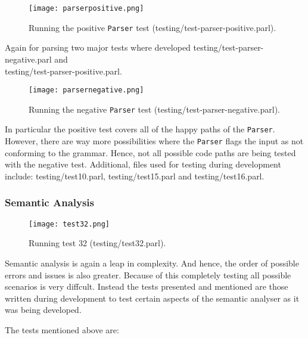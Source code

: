 \begin{figure}[H]
\centering
\texttt{[image: parserpositive.png]}
\caption{Running the positive \texttt{Parser} test
(testing/test-parser-positive.parl).}
\end{figure}

Again for parsing two major tests where developed
testing/test-parser-negative.parl and \\
testing/test-parser-positive.parl.

\begin{figure}[H]
\centering
\texttt{[image: parsernegative.png]}
\caption{Running the negative \texttt{Parser} test
(testing/test-parser-negative.parl).}
\end{figure}

In particular the positive test covers all of the happy paths of
the \texttt{Parser}. However, there are way more possibilities
where the \texttt{Parser} flags the input as not conforming to
the grammar. Hence, not all possible code paths are being tested
with the negative test. Additional, files used for testing
during development include: testing/test10.parl,
testing/test15.parl and testing/test16.parl.

\subsubsection{Semantic Analysis}

\begin{figure}[H]
\centering
\texttt{[image: test32.png]}
\caption{Running test 32 (testing/test32.parl).}
\end{figure}

Semantic analysis is again a leap in complexity. And hence, the
order of possible errors and issues is also greater. Because of
this completely testing all possible scenarios is very diffcult.
Instead the tests presented and mentioned are those written
during development to test certain aspects of the semantic
analyser as it was being developed.

The tests mentioned above are:

